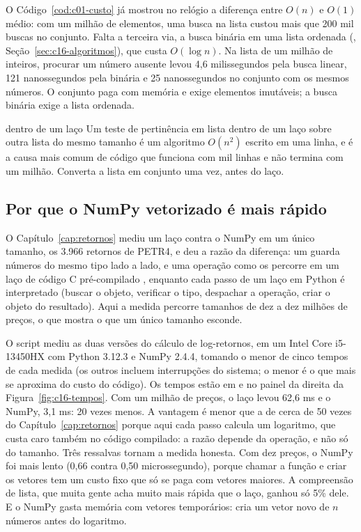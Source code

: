 O Código~\ref{cod:c01-custo} já mostrou no relógio a diferença entre $O(n)$ e $O(1)$ médio: com um milhão de elementos, uma busca na lista custou mais que 200 mil buscas no conjunto. Falta a terceira via, a busca binária em uma lista ordenada (, Seção~\ref{sec:c16-algoritmos}), que custa $O(\log n)$. Na lista de um milhão de inteiros, procurar um número ausente levou 4,6 milissegundos pela busca linear, 121 nanossegundos pela binária e 25 nanossegundos no conjunto com os mesmos números. O conjunto paga com memória e exige elementos imutáveis; a busca binária exige a lista ordenada.

\begin{armadilha}{ dentro de um laço}
Um teste de pertinência em lista dentro de um laço sobre outra lista do mesmo tamanho é um algoritmo $O(n^2)$ escrito em uma linha, e é a causa mais comum de código que funciona com mil linhas e não termina com um milhão. Converta a lista em conjunto uma vez, antes do laço.
\end{armadilha}

\subsection{Por que o NumPy vetorizado é mais rápido}

O Capítulo~\ref{cap:retornos} mediu um laço contra o NumPy em um único tamanho, os 3.966 retornos de PETR4, e deu a razão da diferença: um  guarda números do mesmo tipo lado a lado, e uma operação como  os percorre em um laço de código C pré-compilado \citep{numpy2026}, enquanto cada passo de um laço em Python é interpretado (buscar o objeto, verificar o tipo, despachar a operação, criar o objeto do resultado). Aqui a medida percorre tamanhos de dez a dez milhões de preços, o que mostra o que um único tamanho esconde.

O script  mediu as duas versões do cálculo de log-retornos, em um Intel Core i5-13450HX com Python 3.12.3 e NumPy 2.4.4, tomando o menor de cinco tempos de cada medida (os outros incluem interrupções do sistema; o menor é o que mais se aproxima do custo do código). Os tempos estão em  e no painel da direita da Figura~\ref{fig:c16-tempos}. Com um milhão de preços, o laço levou 62,6 ms e o NumPy, 3,1 ms: 20 vezes menos. A vantagem é menor que a de cerca de 50 vezes do Capítulo~\ref{cap:retornos} porque aqui cada passo calcula um logaritmo, que custa caro também no código compilado: a razão depende da operação, e não só do tamanho. Três ressalvas tornam a medida honesta. Com dez preços, o NumPy foi mais lento (0,66 contra 0,50 microssegundo), porque chamar a função e criar os vetores tem um custo fixo que só se paga com vetores maiores. A compreensão de lista, que muita gente acha muito mais rápida que o laço, ganhou só 5\% dele. E o NumPy gasta memória com vetores temporários:  cria um vetor novo de $n$ números antes do logaritmo.


